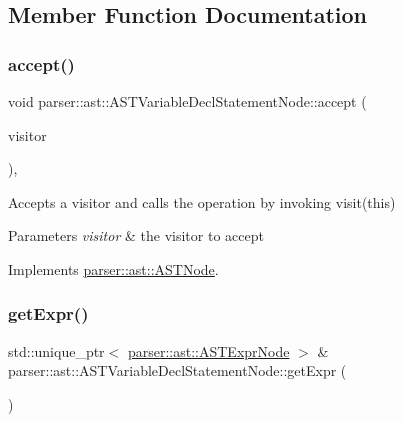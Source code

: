 \subsection{Member Function Documentation}
\mbox{\label{classparser_1_1ast_1_1ASTVariableDeclStatementNode_a4448c73408ed86719c6f3993a4eb8869}} 
\subsubsection{\texorpdfstring{accept()}{accept()}}
{\footnotesize\ttfamily void parser\+::ast\+::\+A\+S\+T\+Variable\+Decl\+Statement\+Node\+::accept (\begin{DoxyParamCaption}\item[{\hyperlink{classvisitor_1_1Visitor}{visitor\+::\+Visitor} $\ast$}]{visitor }\end{DoxyParamCaption})\hspace{0.3cm}{\ttfamily [override]}, {\ttfamily [virtual]}}

Accepts a visitor and calls the operation by invoking {\ttfamily visit(this)} 
\begin{DoxyParams}{Parameters}
{\em visitor} & the visitor to accept \\
\hline
\end{DoxyParams}


Implements \hyperlink{classparser_1_1ast_1_1ASTNode_a3ff84fdfdbbc5c39b70b4d04c22e7dc3}{parser\+::ast\+::\+A\+S\+T\+Node}.

\mbox{\label{classparser_1_1ast_1_1ASTVariableDeclStatementNode_aaa330017ed4652ecb8d9900ac774b60f}} 
\subsubsection{\texorpdfstring{get\+Expr()}{getExpr()}}
{\footnotesize\ttfamily std\+::unique\+\_\+ptr$<$ \hyperlink{classparser_1_1ast_1_1ASTExprNode}{parser\+::ast\+::\+A\+S\+T\+Expr\+Node} $>$ \& parser\+::ast\+::\+A\+S\+T\+Variable\+Decl\+Statement\+Node\+::get\+Expr (\begin{DoxyParamCaption}{ }\end{DoxyParamCaption})}

